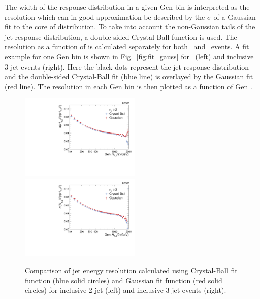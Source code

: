 The width of the response distribution in a given Gen \httwo bin is interpreted as the resolution which can in good approximation be described by the $\sigma$ of a Gaussian fit to the core of distribution. To take into account the non-Gaussian tails of the jet response distribution, a double-sided Crystal-Ball function is used. The resolution as a function of \httwo is calculated separately for both \njt~and \njth~events. A fit example for one Gen \httwo bin is shown in Fig.~\ref{fig:fit_gauss} for \njt~(left) and inclusive 3-jet events (right). Here the black dots represent the jet response distribution and the double-sided Crystal-Ball fit (blue line) is overlayed by the Gaussian fit (red line). The resolution in each Gen \httwo bin is then plotted as a function of Gen \httwo. 

\begin{figure}[!h]
 \begin{center}
 \hspace*{-5mm}\includegraphics[width=0.51\textwidth]{Plots_HT_2_150/Comparison_Resolution_Crystal_Gauss_2.pdf}%
 ~~\includegraphics[width=0.51\textwidth]{Plots_HT_2_150/Comparison_Resolution_Crystal_Gauss_3.pdf}
 \caption{Comparison of jet energy resolution calculated using Crystal-Ball fit function (blue solid circles) and Gaussian fit function (red solid circles) for inclusive 2-jet (left) and inclusive 3-jet events (right).}
 \label{fig:res_comp}
  \end{center}
\end{figure}

